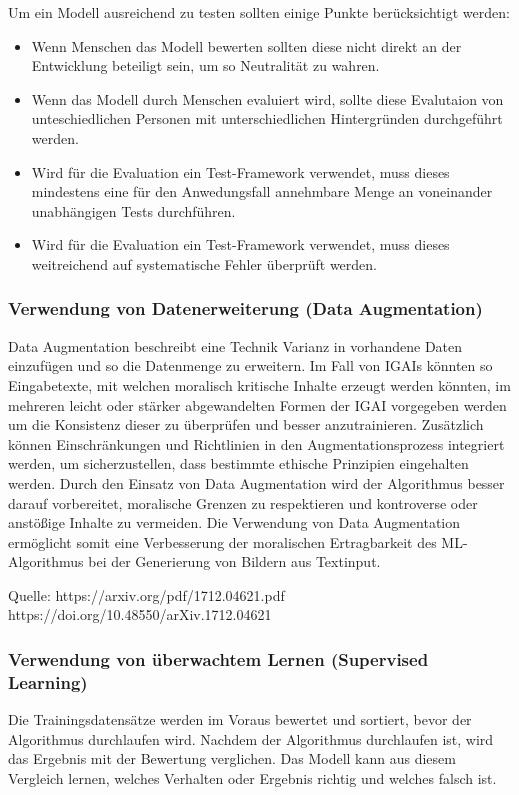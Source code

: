 \documentclass[12pt]{article}
\begin{document}
Um ein Modell ausreichend zu testen sollten einige Punkte berücksichtigt werden:
\begin{itemize}
    \item Wenn Menschen das Modell bewerten sollten diese nicht direkt an der Entwicklung beteiligt sein, um so Neutralität zu wahren.
    \item Wenn das Modell durch Menschen evaluiert wird, sollte diese Evalutaion von unteschiedlichen Personen mit unterschiedlichen Hintergründen durchgeführt werden.
    \item Wird für die Evaluation ein Test-Framework verwendet, muss dieses mindestens eine für den Anwedungsfall annehmbare Menge an voneinander unabhängigen Tests durchführen.
    \item Wird für die Evaluation ein Test-Framework verwendet, muss dieses weitreichend auf systematische Fehler überprüft werden.
\end{itemize}

\subsubsection{Verwendung von Datenerweiterung (Data Augmentation)}
Data Augmentation beschreibt eine Technik Varianz in vorhandene Daten einzufügen und so die Datenmenge zu erweitern.
Im Fall von IGAIs könnten so Eingabetexte, mit welchen moralisch kritische Inhalte erzeugt werden könnten, im mehreren leicht oder stärker abgewandelten Formen der IGAI vorgegeben werden um die Konsistenz dieser zu überprüfen und besser anzutrainieren.  
Zusätzlich können Einschränkungen und Richtlinien in den Augmentationsprozess integriert werden, um sicherzustellen, dass bestimmte ethische Prinzipien eingehalten werden. 
Durch den Einsatz von Data Augmentation wird der Algorithmus besser darauf vorbereitet, moralische Grenzen zu respektieren und kontroverse oder anstößige Inhalte zu vermeiden. 
Die Verwendung von Data Augmentation ermöglicht somit eine Verbesserung der moralischen Ertragbarkeit des ML-Algorithmus bei der Generierung von Bildern aus Textinput.

Quelle: 
https://arxiv.org/pdf/1712.04621.pdf 
https://doi.org/10.48550/arXiv.1712.04621

\subsubsection{Verwendung von überwachtem Lernen (Supervised Learning)}
Die Trainingsdatensätze werden im Voraus bewertet und sortiert, bevor der Algorithmus durchlaufen wird. Nachdem der Algorithmus durchlaufen ist, wird das Ergebnis mit der Bewertung verglichen. 
Das Modell kann aus diesem Vergleich lernen, welches Verhalten oder Ergebnis richtig und welches falsch ist.
\end{document}
